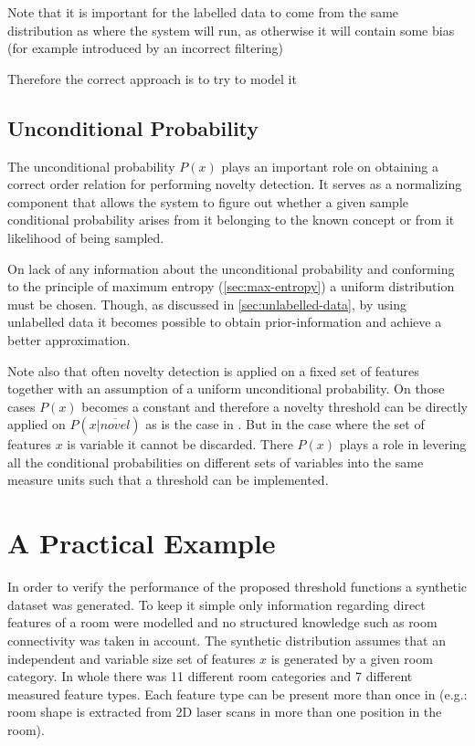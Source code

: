 Note that it is important for the labelled data to come from the same
distribution as where the system will run, as otherwise it will contain some
bias (for example introduced by an incorrect filtering)

Therefore the correct approach is to try to model it 


\subsection{Unconditional Probability}
The unconditional probability $P(x)$ plays an important role on obtaining a
correct order relation for performing novelty detection.
It serves as a normalizing component that allows the system to figure out
whether a given sample conditional probability arises from it belonging to
the known concept or from it likelihood of being sampled.


On lack of any information about the unconditional probability and conforming to
the principle of maximum entropy (\autoref{sec:max-entropy}) a uniform
distribution must be chosen.
Though, as discussed in \autoref{sec:unlabelled-data}, by using unlabelled data
it becomes possible to obtain prior-information and achieve a better
approximation.


Note also that often novelty detection is applied on a fixed set of features
together with an assumption of a uniform unconditional probability.
On those cases $P(x)$ becomes a constant and therefore a novelty threshold
can be directly applied on $P(x|\overline{novel})$ as is the case in \cite{bishop1994novelty}.
But in the case where the set of features $x$ is variable it cannot be
discarded. There $P(x)$ plays a role in levering all the conditional
probabilities on different sets of variables into the same measure units
such that a threshold can be implemented.



\section{A Practical Example}
\label{sec:unlabelled-data}
In order to verify the performance of the proposed threshold functions a synthetic dataset
was generated. To keep it simple only information regarding direct features of
a room were modelled and no structured knowledge such as room connectivity was taken
in account.
The synthetic distribution assumes that an independent and variable size set of features
$x$ is generated by a given room category.
In whole there was 11 different room categories and 7 different measured feature
types. Each feature type can be present more than once in (e.g.: room shape is
extracted from 2D laser scans in more than one position in the room).

